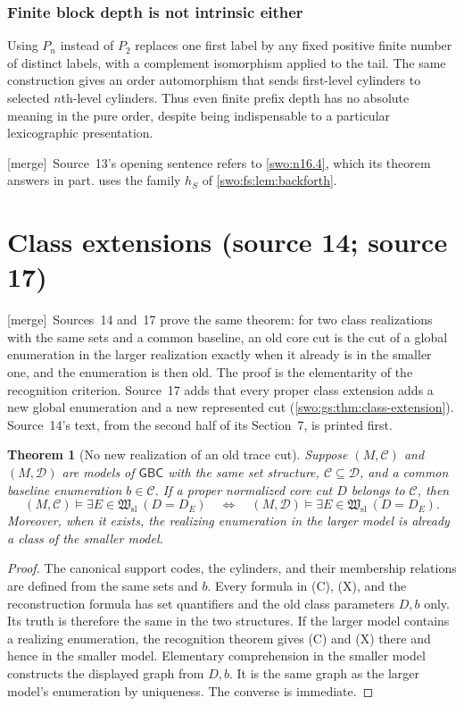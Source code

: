 \documentclass[11pt]{article}
\newtheorem{theorem}{Theorem}[section]
\theoremstyle{definition}
\theoremstyle{remark}
\newcommand{\Hsl}{\mathfrak W_{\mathrm{sl}}}
\newcommand{\GBC}{\mathsf{GBC}}
\newcommand{\merge}{\textsf{[merge]}}
\begin{document}
\subsubsection{Finite block depth is not intrinsic either}

Using $P_n$ instead of $P_2$ replaces one first label by any fixed
positive finite number of distinct labels, with a complement
isomorphism applied to the tail. The same construction gives an order
automorphism that sends first-level cylinders to selected $n$th-level
cylinders. Thus even finite prefix depth has no absolute meaning in
the pure order, despite being indispensable to a particular
lexicographic presentation.

\merge\ Source~13's opening sentence refers to \cref{swo:n16.4}, which its
theorem answers in part.  uses the family $h_S$ of
\cref{swo:fs:lem:backforth}.

\section{Class extensions (source 14; source 17)}\label{swo:viii:sec:extensions}

\merge\ Sources~14 and~17 prove the same theorem: for two class realizations
with the same sets and a common baseline, an old core cut is the cut of a
global enumeration in the larger realization exactly when it already is in
the smaller one, and the enumeration is then old. The proof is the
elementarity of the recognition criterion. Source~17 adds that every proper
class extension adds a new global enumeration and a new represented cut
(\cref{swo:gs:thm:class-extension}). Source~14's text, from the second half
of its Section~7, is printed first.

\begin{theorem}[No new realization of an old trace cut]\label{swo:tc:thm:absolute}
Suppose $(M,\mathcal C)$ and $(M,\mathcal D)$ are models of $\GBC$
with the same set structure, $\mathcal C\subseteq\mathcal D$, and a
common baseline enumeration $b\in\mathcal C$. If a proper normalized
core cut $D$ belongs to $\mathcal C$, then
\[
 (M,\mathcal C)\models \exists E\in \Hsl\ (D=D_E)
 \quad\Longleftrightarrow\quad
 (M,\mathcal D)\models \exists E\in \Hsl\ (D=D_E).
\]
Moreover, when it exists, the realizing enumeration in the larger model
is already a class of the smaller model.
\end{theorem}
\begin{proof}
The canonical support codes, the cylinders, and their membership
relations are defined from the same sets and $b$. Every formula in
(C), (X), and the reconstruction formula has set quantifiers and the
old class parameters $D,b$ only. Its truth is therefore the same in the
two structures. If the larger model contains a realizing enumeration,
the recognition theorem gives (C) and (X) there and hence in the
smaller model. Elementary comprehension in the smaller model constructs
the displayed graph from $D,b$. It is the same graph as the larger
model's enumeration by uniqueness. The converse is immediate.
\end{proof}
\end{document}
